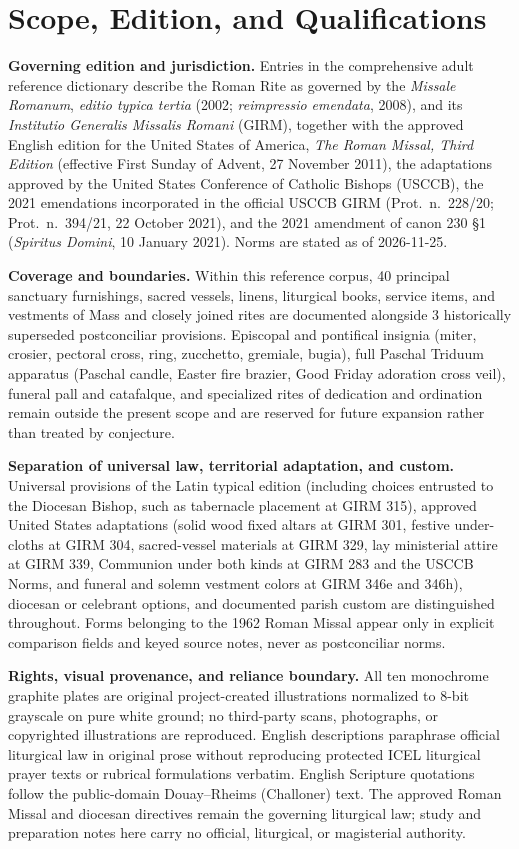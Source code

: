 \clearpage
\section{Scope, Edition, and Qualifications}
\textbf{Governing edition and jurisdiction.} Entries in the comprehensive adult reference dictionary describe the Roman Rite as governed by the \textit{Missale Romanum}, \textit{editio typica tertia} (2002; \textit{reimpressio emendata}, 2008), and its \textit{Institutio Generalis Missalis Romani} (GIRM), together with the approved English edition for the United States of America, \textit{The Roman Missal, Third Edition} (effective First Sunday of Advent, 27 November 2011), the adaptations approved by the United States Conference of Catholic Bishops (USCCB), the 2021 emendations incorporated in the official USCCB GIRM (Prot.~n.~228/20; Prot.~n.~394/21, 22 October 2021), and the 2021 amendment of canon 230 \S1 (\textit{Spiritus Domini}, 10 January 2021). Norms are stated as of 2026-11-25.

\textbf{Coverage and boundaries.} Within this reference corpus, 40 principal sanctuary furnishings, sacred vessels, linens, liturgical books, service items, and vestments of Mass and closely joined rites are documented alongside 3 historically superseded postconciliar provisions. Episcopal and pontifical insignia (miter, crosier, pectoral cross, ring, zucchetto, gremiale, bugia), full Paschal Triduum apparatus (Paschal candle, Easter fire brazier, Good Friday adoration cross veil), funeral pall and catafalque, and specialized rites of dedication and ordination remain outside the present scope and are reserved for future expansion rather than treated by conjecture.

\textbf{Separation of universal law, territorial adaptation, and custom.} Universal provisions of the Latin typical edition (including choices entrusted to the Diocesan Bishop, such as tabernacle placement at GIRM 315), approved United States adaptations (solid wood fixed altars at GIRM 301, festive under-cloths at GIRM 304, sacred-vessel materials at GIRM 329, lay ministerial attire at GIRM 339, Communion under both kinds at GIRM 283 and the USCCB Norms, and funeral and solemn vestment colors at GIRM 346e and 346h), diocesan or celebrant options, and documented parish custom are distinguished throughout. Forms belonging to the 1962 Roman Missal appear only in explicit comparison fields and keyed source notes, never as postconciliar norms.

\textbf{Rights, visual provenance, and reliance boundary.} All ten monochrome graphite plates are original project-created illustrations normalized to 8-bit grayscale on pure white ground; no third-party scans, photographs, or copyrighted illustrations are reproduced. English descriptions paraphrase official liturgical law in original prose without reproducing protected ICEL liturgical prayer texts or rubrical formulations verbatim. English Scripture quotations follow the public-domain Douay--Rheims (Challoner) text. The approved Roman Missal and diocesan directives remain the governing liturgical law; study and preparation notes here carry no official, liturgical, or magisterial authority.

